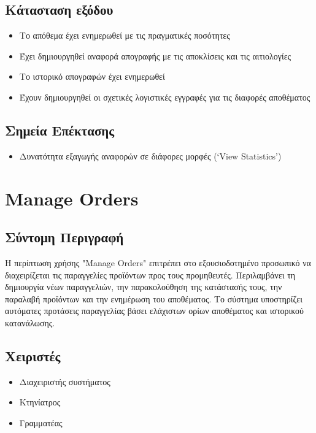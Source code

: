 \documentclass[12pt,a4paper,twoside]{book}
\begin{document}
\subsection{Κάτασταση εξόδου} %
\begin{itemize}
  \item Το απόθεμα έχει ενημερωθεί με τις πραγματικές ποσότητες
  \item Έχει δημιουργηθεί αναφορά απογραφής με τις αποκλίσεις και τις αιτιολογίες %
  \item Το ιστορικό απογραφών έχει ενημερωθεί
  \item Έχουν δημιουργηθεί οι σχετικές λογιστικές εγγραφές για τις διαφορές αποθέματος %
\end{itemize}

\subsection{Σημεία Επέκτασης}
\begin{itemize}
  \item Δυνατότητα εξαγωγής αναφορών σε διάφορες μορφές (`View Statistics') %
\end{itemize}

\section{Manage Orders}

\subsection{Σύντομη Περιγραφή}
Η περίπτωση χρήσης "Manage Orders" επιτρέπει στο εξουσιοδοτημένο προσωπικό να διαχειρίζεται τις παραγγελίες προϊόντων προς τους προμηθευτές. Περιλαμβάνει τη δημιουργία νέων παραγγελιών, την παρακολούθηση της κατάστασής τους, την παραλαβή προϊόντων και την ενημέρωση του αποθέματος. Το σύστημα υποστηρίζει αυτόματες προτάσεις παραγγελίας βάσει ελάχιστων ορίων αποθέματος και ιστορικού κατανάλωσης. %

\subsection{Χειριστές}
\begin{itemize}
  \item Διαχειριστής συστήματος
  \item Κτηνίατρος
  \item Γραμματέας
\end{itemize}
\end{document}
